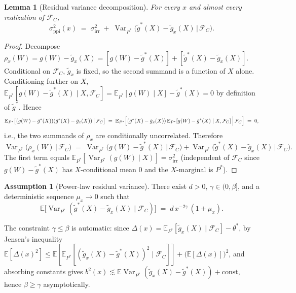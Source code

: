 \documentclass[11pt]{article}
\theoremstyle{plain}
\newtheorem{lemma}[theorem]{Lemma}
\theoremstyle{definition}
\newtheorem{assumption}{Assumption}[section]
\theoremstyle{remark}
\newcommand{\E}{\mathbb{E}}
\newcommand{\Var}{\operatorname{Var}}
\begin{document}
\begin{lemma}[Residual variance decomposition]\label{lem:res-var}
For every $x$ and almost every realization of $\mathcal{F}_C$,
\begin{equation}\label{eq:res-var}
\sigma_{\mathrm{ppi}}^2(x)\;=\;\sigma_{\mathrm{irr}}^2\;+\;\Var_{P^*}\bigl(\tilde g^*(X)-\tilde g_x(X)\,\big|\,\mathcal{F}_C\bigr).
\end{equation}
\end{lemma}

\begin{proof}
Decompose $\rho_x(W)=g(W)-\tilde g_x(X)=[g(W)-\tilde g^*(X)]+[\tilde g^*(X)-\tilde g_x(X)]$. Conditional on $\mathcal{F}_C$, $\tilde g_x$ is fixed, so the second summand is a function of $X$ alone. Conditioning further on $X$, $\E_{P^*}[g(W)-\tilde g^*(X)\mid X,\mathcal{F}_C]=\E_{P^*}[g(W)\mid X]-\tilde g^*(X)=0$ by definition of $\tilde g^*$. Hence
\begin{equation*}
\E_{P^*}\bigl[(g(W)-\tilde g^*(X))(\tilde g^*(X)-\tilde g_x(X))\,\big|\,\mathcal{F}_C\bigr]\;=\;\E_{P^*}\Bigl[(\tilde g^*(X)-\tilde g_x(X))\,\E_{P^*}[g(W)-\tilde g^*(X)\mid X,\mathcal{F}_C]\,\Big|\,\mathcal{F}_C\Bigr]\;=\;0,
\end{equation*}
i.e., the two summands of $\rho_x$ are conditionally uncorrelated. Therefore
\begin{equation*}
\Var_{P^*}\bigl(\rho_x(W)\,\big|\,\mathcal{F}_C\bigr)\;=\;\Var_{P^*}\bigl(g(W)-\tilde g^*(X)\,\big|\,\mathcal{F}_C\bigr)+\Var_{P^*}\bigl(\tilde g^*(X)-\tilde g_x(X)\,\big|\,\mathcal{F}_C\bigr).
\end{equation*}
The first term equals $\E_{P^*}[\Var_{P^*}(g(W)\mid X)]=\sigma_{\mathrm{irr}}^2$ (independent of $\mathcal{F}_C$ since $g(W)-\tilde g^*(X)$ has $X$-conditional mean $0$ and the $X$-marginal is $P^*$).
\end{proof}

\begin{assumption}[Power-law residual variance]\label{asm:res-pl}
There exist $d>0$, $\gamma\in(0,\beta]$, and a deterministic sequence $\mu_x\to0$ such that
\begin{equation}\label{eq:res-pl}
\E\bigl[\Var_{P^*}(\tilde g^*(X)-\tilde g_x(X)\mid\mathcal{F}_C)\bigr]\;=\;d\,x^{-2\gamma}\,(1+\mu_x).
\end{equation}
\end{assumption}

The constraint $\gamma\le\beta$ is automatic: since $\Delta(x)=\E_{P^*}[\tilde g_x(X)\mid\mathcal{F}_C]-\theta^*$, by Jensen's inequality $\E[\Delta(x)^2]\le\E[\E_{P^*}[(\tilde g_x(X)-\tilde g^*(X))^2\mid\mathcal{F}_C]]+\bigl(\E[\Delta(x)]\bigr)^2$, and absorbing constants gives $b^2(x)\lesssim\E\Var_{P^*}(\tilde g_x(X)-\tilde g^*(X))+\text{const}$, hence $\beta\ge\gamma$ asymptotically.
\end{document}
